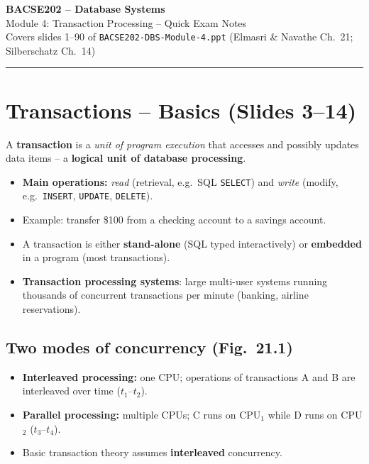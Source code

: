 \documentclass[10pt,a4paper]{article}
\newcommand{\op}[1]{\texttt{#1}}
\begin{document}
\begin{center}
{\LARGE\bfseries BACSE202 -- Database Systems}\\[3pt]
{\Large Module 4: Transaction Processing -- Quick Exam Notes}\\[3pt]
{\small Covers slides 1--90 of \texttt{BACSE202-DBS-Module-4.ppt} (Elmasri \& Navathe Ch.~21; Silberschatz Ch.~14)}
\end{center}

\tableofcontents
\vspace{4pt}\hrule

\section{Transactions -- Basics (Slides 3--14)}

\begin{keybox}[Definition]
A \textbf{transaction} is a \emph{unit of program execution} that accesses and possibly updates data items -- a \textbf{logical unit of database processing}.
\end{keybox}

\begin{itemize}
  \item \textbf{Main operations:} \emph{read} (retrieval, e.g.\ SQL \op{SELECT}) and \emph{write} (modify, e.g.\ \op{INSERT}, \op{UPDATE}, \op{DELETE}).
  \item Example: transfer \$100 from a checking account to a savings account.
  \item A transaction is either \textbf{stand-alone} (SQL typed interactively) or \textbf{embedded} in a program (most transactions).
  \item \textbf{Transaction processing systems}: large multi-user systems running thousands of concurrent transactions per minute (banking, airline reservations).
\end{itemize}

\subsection*{Two modes of concurrency (Fig.~21.1)}
\begin{itemize}
  \item \textbf{Interleaved processing:} one CPU; operations of transactions A and B are interleaved over time ($t_1$--$t_2$).
  \item \textbf{Parallel processing:} multiple CPUs; C runs on CPU$_1$ while D runs on CPU$_2$ ($t_3$--$t_4$).
  \item Basic transaction theory assumes \textbf{interleaved} concurrency.
\end{itemize}
\end{document}
